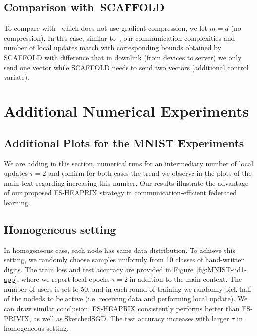 \documentclass{article}
\begin{document}
\subsection{Comparison with~SCAFFOLD}{\color{blue}\:  To compare with~\cite{karimireddy2019scaffold} which does not use gradient compression, we let $m=d$ (no compression). In this case, similar to~\cite{haddadpour2020federated}, our communication complexities and number of local updates match with corresponding bounds obtained by SCAFFOLD with difference that in downlink (from devices to server) we only send one vector while SCAFFOLD needs to send two vectors (additional control variate).}
\fi

\section{Additional Numerical Experiments}

\subsection{Additional Plots for the MNIST Experiments}
We are adding in this section, numerical runs for an intermediary number of local updates $\tau =2$ and confirm for both cases the trend we observe in the plots of the main text regarding increasing this number. Our results illustrate the advantage of our proposed FS-HEAPRIX strategy in communication-efficient federated learning.

\subsection{Homogeneous setting}
In homogeneous case, each node has same data distribution. To achieve this setting, we randomly choose samples uniformly from 10 classes of hand-written digits. The train loss and test accuracy are provided in Figure~\ref{fig:MNIST-iid1-app}, where we report local epochs $\tau=2$ in addition to the main context. The number of users is set to 50, and in each round of training we randomly pick half of the nodeds to be active (i.e. receiving data and performing local update). We can draw similar conclusion: FS-HEAPRIX consistently performs better than FS-PRIVIX, as well as SketchedSGD. The test accuracy increases with larger $\tau$ in homogeneous setting.
\end{document}

